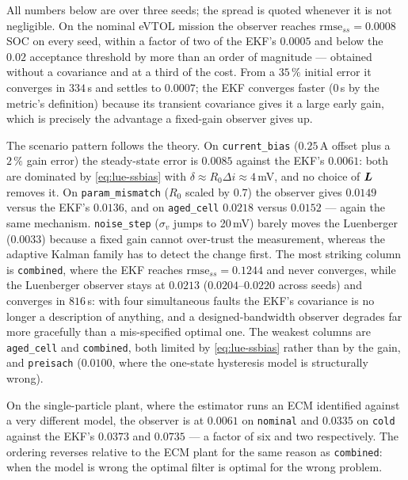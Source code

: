 All numbers below are over three seeds; the spread is quoted whenever it is not negligible.  On
the nominal eVTOL mission the observer reaches $\mathrm{rmse}_{ss} = 0.0008$ SOC on every seed,
within a factor of two of the EKF's $0.0005$ and below the $0.02$ acceptance threshold by more
than an order of magnitude --- obtained without a covariance and at a third of the cost.  From a
$35\,\%$ initial error it converges in $334$\,s and settles to $0.0007$; the EKF converges faster
($0\,$s by the metric's definition) because its transient covariance gives it a large early gain,
which is precisely the advantage a fixed-gain observer gives up.

The scenario pattern follows the theory.  On \texttt{current\_bias} ($0.25$\,A offset plus a
$2\,\%$ gain error) the steady-state error is $0.0085$ against the EKF's $0.0061$: both are
dominated by \eqref{eq:lue-ssbias} with $\delta \approx R_0\Delta i \approx 4$\,mV, and no choice
of $\bm{L}$ removes it.  On \texttt{param\_mismatch} ($R_0$ scaled by $0.7$) the observer gives
$0.0149$ versus the EKF's $0.0136$, and on \texttt{aged\_cell} $0.0218$ versus $0.0152$ --- again
the same mechanism.  \texttt{noise\_step} ($\sigma_v$ jumps to 20\,mV) barely moves the
Luenberger ($0.0033$) because a fixed gain cannot over-trust the measurement, whereas the
adaptive Kalman family has to detect the change first.  The most striking column is
\texttt{combined}, where the EKF reaches $\mathrm{rmse}_{ss}=0.1244$ and never converges, while
the Luenberger observer stays at $0.0213$ ($0.0204$--$0.0220$ across seeds) and converges in
$816$\,s: with four simultaneous faults the EKF's covariance is no longer a description of
anything, and a designed-bandwidth observer degrades far more gracefully than a mis-specified
optimal one.  The weakest columns are \texttt{aged\_cell} and \texttt{combined}, both limited by
\eqref{eq:lue-ssbias} rather than by the gain, and \texttt{preisach} ($0.0100$, where the
one-state hysteresis model is structurally wrong).

On the single-particle plant, where the estimator runs an ECM identified against a very different
model, the observer is at $0.0061$ on \texttt{nominal} and $0.0335$ on \texttt{cold} against the
EKF's $0.0373$ and $0.0735$ --- a factor of six and two respectively.  The ordering reverses
relative to the ECM plant for the same reason as \texttt{combined}: when the model is wrong the
optimal filter is optimal for the wrong problem.

